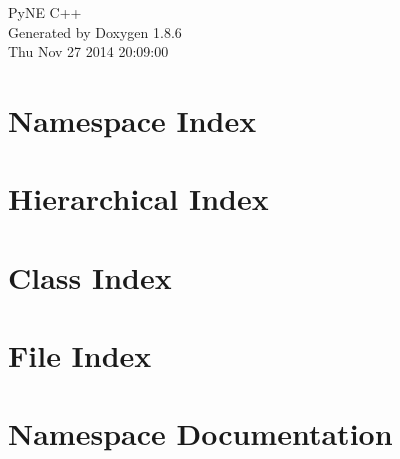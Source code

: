 \documentclass[twoside]{book}
\newcommand{\clearemptydoublepage}{%
  \newpage{\pagestyle{empty}\cleardoublepage}%
}
\begin{document}
\hypersetup{pageanchor=false}
\begin{titlepage}
\vspace*{7cm}
\begin{center}%
{\Large Py\-N\-E C++ }\\
\vspace*{1cm}
{\large Generated by Doxygen 1.8.6}\\
\vspace*{0.5cm}
{\small Thu Nov 27 2014 20:09:00}\\
\end{center}
\end{titlepage}
\clearemptydoublepage
\tableofcontents
\clearemptydoublepage
{}
\hypersetup{pageanchor=true}

\chapter{Namespace Index}

\chapter{Hierarchical Index}

\chapter{Class Index}

\chapter{File Index}

\chapter{Namespace Documentation}















\end{document}

